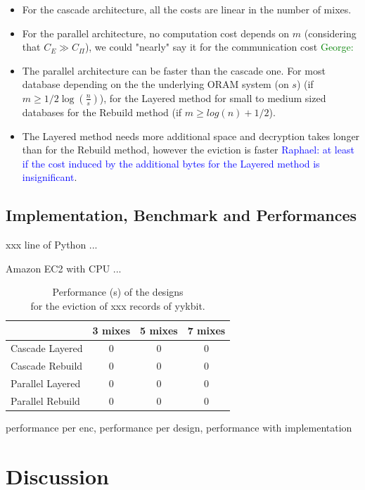 \documentclass[USenglish,oneside,twocolumn]{article}
\newcommand{\raphael}[1]{\textcolor{blue}{Raphael: #1}}
\newcommand{\george}[1]{\textcolor{green}{George: #1}}
\begin{document}
\begin{itemize}
	\item For the cascade architecture, all the costs are linear in the number of mixes.
	\item For the parallel architecture, no computation cost depends on $m$ (considering that $C_E \gg C_{\Pi}$), we could "nearly" say it for the communication cost \george{}
	\item The parallel architecture can be faster than the cascade one. For most database depending on the the underlying ORAM system (on $s$) (if $m \geq 1/2 \log(\frac{n}{s})$), for the Layered method for small to medium sized databases for the Rebuild method (if $m \geq log(n) +1/2$).
	\item The Layered method needs more additional space and decryption takes longer than for the Rebuild method, however the eviction is faster \raphael{at least if the cost induced by the additional bytes for the Layered method is insignificant}.
\end{itemize}

\subsection{Implementation, Benchmark and Performances}\label{Implementation}

xxx line of Python ...

Amazon EC2 with CPU ...


\begin{table}[H]
\vspace{0pt}
\centering
\begin{tabular}{l *3c}
\toprule
    					& 3 mixes	  	& 5 mixes		& 7 mixes	\\
\midrule
Cascade Layered  	& 0 				& 0 				& 0 			\\
Cascade Rebuild  	& 0 				& 0 				& 0 			\\
Parallel Layered 	& 0 				& 0 				& 0 			\\
Parallel Rebuild  	& 0 				& 0 				& 0 			\\
\bottomrule
\end{tabular}
\centering
\caption{Performance (s) of the designs \\ for the eviction of xxx records of yykbit.}
\end{table}

performance per enc, performance per design, performance with implementation


\section{Discussion}\label{Discussion}
\end{document}
